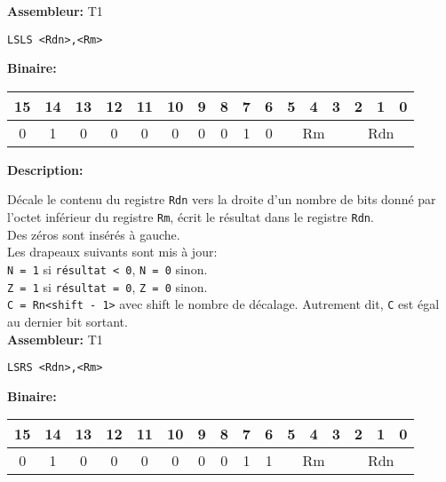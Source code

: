 \documentclass{article}
\begin{document}
    \textbf{Assembleur:} T1

    \begin{lstlisting}
LSLS <Rdn>,<Rm>
    \end{lstlisting}

    \textbf{Binaire:}\\

    \begin{tabular}{| c c c c c c c c c c c c c c c c |}
        \hline
        15 & 14 & 13 & 12 & 11 & 10 & \multicolumn{1}{|c}{9} & 8 & 7 & 6 & \multicolumn{1}{|c}{5} & 4 & 3 & \multicolumn{1}{|c}{2} & 1 & 0 \\
        \hline
        0 & 1 & 0 & 0 & 0 & 0 & \multicolumn{1}{|c}{0} & 0 & 1 & 0 & \multicolumn{3}{|c}{Rm} & \multicolumn{3}{|c|}{Rdn} \\
        \hline
    \end{tabular}




    \textbf{Description: }

    Décale le contenu du registre \texttt{Rdn} vers la droite d'un nombre de bits donné par l'octet inférieur du registre \texttt{Rm}, écrit le résultat dans le registre \texttt{Rdn}.\\
    Des zéros sont insérés à gauche.\\
    Les drapeaux suivants sont mis à jour:\\
    \texttt{N = 1} si \texttt{résultat < 0}, \texttt{N = 0} sinon.\\
    \texttt{Z = 1} si \texttt{résultat = 0}, \texttt{Z = 0} sinon.\\
    \texttt{C = Rn<shift - 1>} avec shift le nombre de décalage.
    Autrement dit, \texttt{C} est égal au dernier bit sortant.\\

    \textbf{Assembleur:} T1

    \begin{lstlisting}
LSRS <Rdn>,<Rm>
    \end{lstlisting}

    \textbf{Binaire:}\\

    \begin{tabular}{| c c c c c c c c c c c c c c c c |}
        \hline
        15 & 14 & 13 & 12 & 11 & 10 & \multicolumn{1}{|c}{9} & 8 & 7 & 6 & \multicolumn{1}{|c}{5} & 4 & 3 & \multicolumn{1}{|c}{2} & 1 & 0 \\
        \hline
        0 & 1 & 0 & 0 & 0 & 0 & \multicolumn{1}{|c}{0} & 0 & 1 & 1 & \multicolumn{3}{|c}{Rm} & \multicolumn{3}{|c|}{Rdn} \\
        \hline
    \end{tabular}
\end{document}
